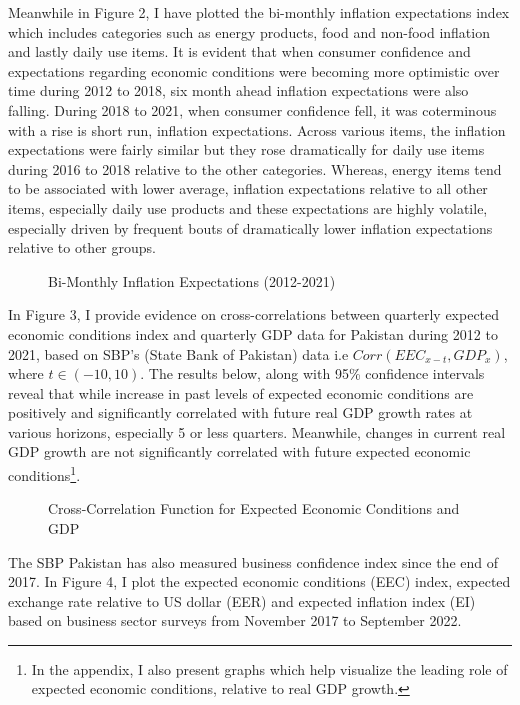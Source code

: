 \documentclass[12pt]{article}
\newcommand{\1}{\mathbbm 1}
\begin{document}
	Meanwhile in Figure 2, I have plotted the bi-monthly inflation expectations index which includes categories such as energy products, food and non-food inflation and lastly daily use items. It is evident that when consumer confidence and expectations regarding economic conditions were becoming more optimistic over time during 2012 to 2018, six month ahead inflation expectations were also falling. During 2018 to 2021, when consumer confidence fell, it was coterminous with a rise is short run, inflation expectations. Across various items, the inflation expectations were fairly similar but they rose dramatically for daily use items during 2016 to 2018 relative to the other categories. Whereas, energy items tend to be associated with lower average, inflation expectations relative to all other items, especially daily use products and these expectations are highly volatile, especially driven by frequent bouts of dramatically lower inflation expectations relative to other groups.

		
		
		
		
		
		\begin{figure}[H]
			\centering
			\scalebox{0.8}{}
			\caption[]{Bi-Monthly Inflation Expectations (2012-2021)}
		\end{figure}
	
	
	In Figure 3, I provide evidence on cross-correlations between quarterly expected economic conditions index and quarterly GDP data for Pakistan during 2012 to 2021, based on SBP's (State Bank of Pakistan) data i.e $Corr(EEC_{x-t}, GDP_{x})$, where $t \in (-10,10)$. The results below, along with 95\% confidence intervals reveal that while increase in past levels of expected economic conditions are positively and significantly correlated with future real GDP growth rates at various horizons, especially 5 or less quarters. Meanwhile, changes in current real GDP growth are not significantly correlated with future expected economic conditions\footnote{In the appendix, I also present graphs which help visualize the leading role of expected economic conditions, relative to real GDP growth.}.
		
		
	\begin{figure}[H]
		\centering
		\scalebox{0.8}{}
		\caption[]{Cross-Correlation Function for Expected Economic Conditions and GDP}
	\end{figure}


The SBP Pakistan has also measured business confidence index since the end of 2017. In Figure 4, I plot the expected economic conditions (EEC) index, expected exchange rate relative to US dollar (EER) and expected inflation index (EI) based on business sector surveys from November 2017 to September 2022.
\end{document}
